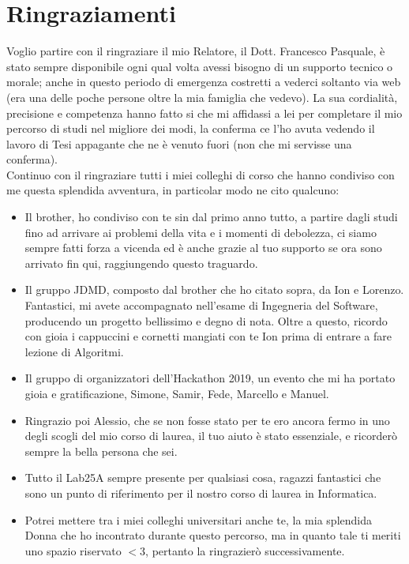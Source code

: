 \chapter*{Ringraziamenti}
Voglio partire con il ringraziare il mio Relatore, il Dott. Francesco Pasquale, \`e stato sempre disponibile ogni qual volta avessi bisogno di un supporto tecnico o morale; anche in questo periodo di emergenza costretti a vederci soltanto via web (era una delle poche persone oltre la mia famiglia che vedevo). La sua cordialit\`a, precisione e competenza hanno fatto si che mi affidassi a lei per completare il mio percorso di studi nel migliore dei modi, la conferma ce l'ho avuta vedendo il lavoro di Tesi appagante che ne \`e venuto fuori (non che mi servisse una conferma).\\
Continuo con il ringraziare tutti i miei colleghi di corso che hanno condiviso con me questa splendida avventura, in particolar modo ne cito qualcuno:\\

\begin{itemize}
    \item Il brother, ho condiviso con te sin dal primo anno tutto, a partire dagli studi fino ad arrivare ai problemi della vita e i momenti di debolezza, ci siamo sempre fatti forza a vicenda ed \`e anche grazie al tuo supporto se ora sono arrivato fin qui, raggiungendo questo traguardo.
    \item Il gruppo JDMD, composto dal brother che ho citato sopra, da Ion e Lorenzo. Fantastici, mi avete accompagnato nell'esame di Ingegneria del Software, producendo un progetto bellissimo e degno di nota. Oltre a questo, ricordo con gioia i cappuccini e cornetti mangiati con te Ion prima di entrare a fare lezione di Algoritmi.
    \item Il gruppo di organizzatori dell'Hackathon 2019, un evento che mi ha portato gioia e gratificazione, Simone, Samir, Fede, Marcello e Manuel.
    \item Ringrazio poi Alessio, che se non fosse stato per te ero ancora fermo in uno degli scogli del mio corso di laurea, il tuo aiuto \`e stato essenziale, e ricorder\`o sempre la bella persona che sei.
    \item Tutto il Lab25A sempre presente per qualsiasi cosa, ragazzi fantastici che sono un punto di riferimento per il nostro corso di laurea in Informatica.
    \item Potrei mettere tra i miei colleghi universitari anche te, la mia splendida Donna che ho incontrato durante questo percorso, ma in quanto tale ti meriti uno spazio riservato $<$3, pertanto la ringrazier\`o successivamente.
\end{itemize}

